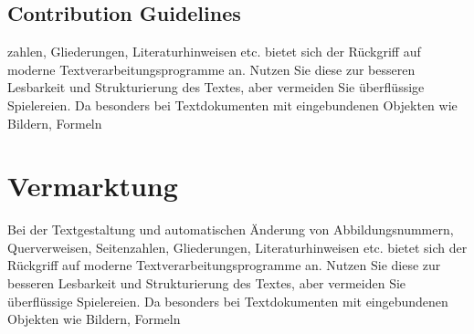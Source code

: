 \subsection{Contribution Guidelines}
zahlen, Gliederungen, Literaturhinweisen etc. bietet sich der Rückgriff
auf moderne Textverarbeitungsprogramme an. Nutzen Sie diese zur besseren Lesbarkeit
und Strukturierung des Textes, aber vermeiden Sie überflüssige Spielereien. Da
besonders bei Textdokumenten mit eingebundenen Objekten wie Bildern, Formeln

\section{Vermarktung}
Bei der Textgestaltung und automatischen Änderung von Abbildungsnummern, Querverweisen,
Seitenzahlen, Gliederungen, Literaturhinweisen etc. bietet sich der Rückgriff
auf moderne Textverarbeitungsprogramme an. Nutzen Sie diese zur besseren Lesbarkeit
und Strukturierung des Textes, aber vermeiden Sie überflüssige Spielereien. Da
besonders bei Textdokumenten mit eingebundenen Objekten wie Bildern, Formeln
